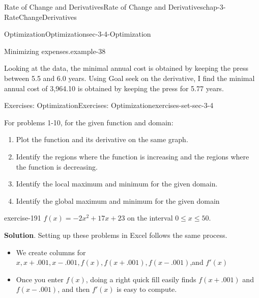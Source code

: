 \documentclass[oneside,10pt,]{book}
\numberwithin{equation}{section}
\begin{document}
\begin{chapterptx}{Rate of Change and Derivatives}{}{Rate of Change and Derivatives}{}{}{chap-3-RateChangeDerivatives}
\begin{sectionptx}{Optimization}{}{Optimization}{}{}{sec-3-4-Optimization}
\begin{example}{Minimizing expenses.}{example-38}
\begin{sidebyside}{1}{0.15}{0.15}{0}
\begin{sbspanel}{0.7}
\end{sbspanel}%
\end{sidebyside}%
\par
\hypertarget{p-1238}{}%
Looking at the data, the minimal annual cost is obtained by keeping the press between 5.5 and 6.0 years.  Using Goal seek on the derivative, I find the minimal annual cost of \textdollar{}3,964.10 is obtained by keeping the press for 5.77 years.%
\end{example}
%
%
\typeout{************************************************}
\typeout{************************************************}
%
\begin{exercises-subsection-numberless}{Exercises: Optimization}{}{Exercises: Optimization}{}{}{exercises-set-sec-3-4}
\par\medskip\noindent%
\hypertarget{exercisegroup-20}{}%
\hypertarget{p-1239}{}%
For problems 1-10, for the given function and domain:%
\leavevmode%
\begin{enumerate}[label=(\alph*)]
\item\hypertarget{li-385}{}\hypertarget{p-1240}{}%
Plot the function and its derivative on the same graph.%
\item\hypertarget{li-386}{}\hypertarget{p-1241}{}%
Identify the regions where the function is increasing and the regions where the function is decreasing.%
\item\hypertarget{li-387}{}\hypertarget{p-1242}{}%
Identify the local maximum and minimum for the given domain.%
\item\hypertarget{li-388}{}\hypertarget{p-1243}{}%
Identify the global maximum and minimum for the given domain%
\end{enumerate}
\begin{exercisegroup}
\begin{divisionexerciseeg}{1}{}{}{exercise-191}%
\hypertarget{p-1244}{}%
\(f(x)=-2x^2+17x+23\) on the interval \(0\le x\le 50\).%
\par\smallskip%
\noindent\textbf{Solution}.\hypertarget{solution-95}{}\quad%
\hypertarget{p-1245}{}%
Setting up these problems in Excel follows the same process.%
\leavevmode%
\begin{itemize}[label=\textbullet]
\item{}\hypertarget{p-1246}{}%
We create columns for \(x, x+.001, x-.001, f(x), f(x+.001), f(x-.001)\),and \(f'(x)\)%
\item{}\hypertarget{p-1247}{}%
Once you enter \(f(x)\), doing a right quick fill easily finds \(f(x+.001)\) and \(f(x-.001)\), and then \(f'(x)\) is easy to compute.%

\end{itemize}
\end{divisionexerciseeg}
\end{exercisegroup}
\end{exercises-subsection-numberless}
\end{sectionptx}
\end{chapterptx}
\end{document}
